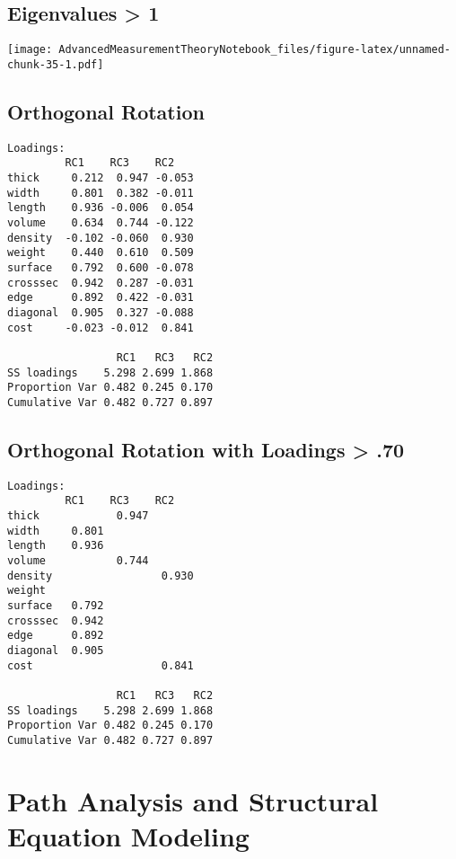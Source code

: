 \documentclass[
]{book}
\begin{document}
\hypertarget{eigenvalues-1}{%
\section{Eigenvalues \textgreater{} 1}\label{eigenvalues-1}}

\texttt{[image: AdvancedMeasurementTheoryNotebook\_files/figure-latex/unnamed-chunk-35-1.pdf]}

\hypertarget{orthogonal-rotation-1}{%
\section{Orthogonal Rotation}\label{orthogonal-rotation-1}}

\footnotesize

\begin{verbatim}
Loadings:
         RC1    RC3    RC2   
thick     0.212  0.947 -0.053
width     0.801  0.382 -0.011
length    0.936 -0.006  0.054
volume    0.634  0.744 -0.122
density  -0.102 -0.060  0.930
weight    0.440  0.610  0.509
surface   0.792  0.600 -0.078
crosssec  0.942  0.287 -0.031
edge      0.892  0.422 -0.031
diagonal  0.905  0.327 -0.088
cost     -0.023 -0.012  0.841

                 RC1   RC3   RC2
SS loadings    5.298 2.699 1.868
Proportion Var 0.482 0.245 0.170
Cumulative Var 0.482 0.727 0.897
\end{verbatim}

\hypertarget{orthogonal-rotation-with-loadings-.70}{%
\section{Orthogonal Rotation with Loadings \textgreater{} .70}\label{orthogonal-rotation-with-loadings-.70}}

\footnotesize

\begin{verbatim}
Loadings:
         RC1    RC3    RC2   
thick            0.947       
width     0.801              
length    0.936              
volume           0.744       
density                 0.930
weight                       
surface   0.792              
crosssec  0.942              
edge      0.892              
diagonal  0.905              
cost                    0.841

                 RC1   RC3   RC2
SS loadings    5.298 2.699 1.868
Proportion Var 0.482 0.245 0.170
Cumulative Var 0.482 0.727 0.897
\end{verbatim}

\hypertarget{path-analysis-and-structural-equation-modeling}{%
\chapter{Path Analysis and Structural Equation Modeling}\label{path-analysis-and-structural-equation-modeling}}
\end{document}
